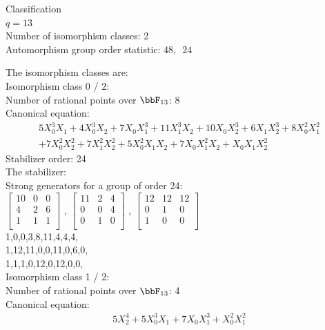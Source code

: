 

Classification\\
$q=13$\\
Number of isomorphism classes: 2\\
Automorphism group order statistic: 
$48,\,$ $24$ \\

\bigskip

The isomorphism classes are:\\
Isomorphism class 0 / 2:\\
Number of rational points over $\bbF_{13}$: 8\\
Canonical equation:
\begin{eqnarray*}
5X_0^3X_1 + 4X_0^3X_2 + 7X_0X_1^3 + 11X_1^3X_2 + 10X_0X_2^3 + 6X_1X_2^3 + 8X_0^2X_1^2\\ + 7X_0^2X_2^2 + 7X_1^2X_2^2 + 5X_0^2X_1X_2 + 7X_0X_1^2X_2 + X_0X_1X_2^2\end{eqnarray*}
Stabilizer order: 24\\
The stabilizer: \\
Strong generators for a group of order 24:\\
$
\left[
\begin{array}{*{3}{r}}
10 & 0 & 0\\
4 & 2 & 6\\
1 & 1 & 1\\
\end{array}
\right]
$
, 
$
\left[
\begin{array}{*{3}{r}}
11 & 2 & 4\\
0 & 0 & 4\\
0 & 1 & 0\\
\end{array}
\right]
$
, 
$
\left[
\begin{array}{*{3}{r}}
12 & 12 & 12\\
0 & 1 & 0\\
1 & 0 & 0\\
\end{array}
\right]
$
\\
1,0,0,3,8,11,4,4,4,\\
1,12,11,0,0,11,0,6,0,\\
1,1,1,0,12,0,12,0,0,\\
Isomorphism class 1 / 2:\\
Number of rational points over $\bbF_{13}$: 4\\
Canonical equation:
\begin{eqnarray*}
5X_2^4 + 5X_0^3X_1 + 7X_0X_1^3 + X_0^2X_1^2\end{eqnarray*}
